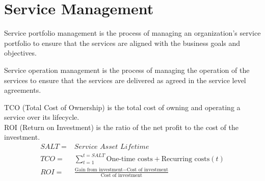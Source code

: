 

\section{Service Management}
Service portfolio management is the process of managing an organization’s service portfolio to ensure that the services are aligned with the business goals and objectives.

Service operation management is the process of managing the operation of the services to ensure that the services are delivered as agreed in the service level agreements.

TCO (Total Cost of Ownership) is the total cost of owning and operating a service over its lifecycle.\\
ROI (Return on Investment) is the ratio of the net profit to the cost of the investment.
\begin{align}
   SALT =& \textit{Service Asset Lifetime}\\
   TCO =& \sum_{t=1}^{t = \textit{SALT}} \text{One-time costs} + \text{Recurring costs}(t)\\
   ROI =& \frac{\text{Gain from investment} - \text{Cost of investment}}{\text{Cost of investment}}
\end{align}